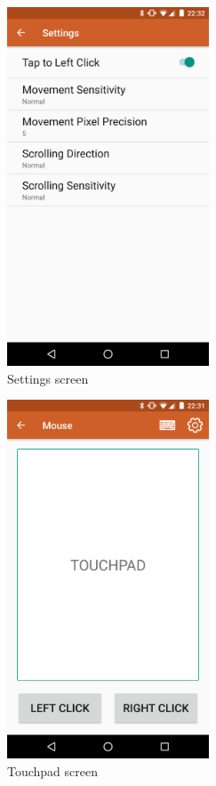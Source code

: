 \documentclass{sig-alternate}
\renewcommand\_{\textunderscore\allowbreak}  %
\begin{document}
\begin{figure}[ht]
	\hypertarget{fig:settings}{}
	\centering
	\caption{Settings screen}
	\includegraphics[width=6cm]{screenshots/settings}
\end{figure}

\begin{figure}[ht]
	\hypertarget{fig:touchpad}{}
	\centering
	\caption{Touchpad screen}
	\includegraphics[width=6cm]{screenshots/touchpad}
\end{figure}
\end{document}
